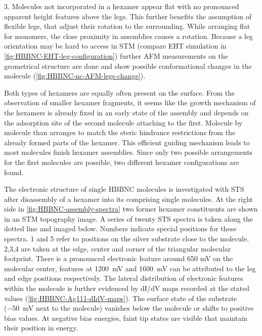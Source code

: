 3. Molecules not incorporated in a hexamer appear flat with no pronounced apparent height features above the legs. This further benefits the assumption of flexible legs, that adjust their rotation to the surrounding. While arranging flat for monomers, the close proximity in assemblies causes a rotation. Because a leg orientation may be hard to access in STM (compare EHT simulation in \autoref{fig:HBBNC-EHT-leg-configuration}) further AFM measurements on the geometrical structure are done and show possible conformational changes in the molecule (\autoref{fig:HBBNC-nc-AFM-legs-change}).

Both types of hexamers are equally often present on the surface. From the observation of smaller hexamer fragments, it seems like the growth mechanism of the hexamers is already fixed in an early state of the assembly and depends on the adsorption site of the second molecule attaching to the first. Molecule by molecule than arranges to match the steric hindrance restrictions from the already formed parts of the hexamer. This efficient guiding mechanism leads to most molecules finish hexamer assemblies. Since only two possible arrangements for the first molecules are possible, two different hexamer configurations are found.

The electronic structure of single HBBNC molecules is investigated with STS after disassembly of a hexamer into its comprising single molecules. At the right side in \autoref{fig:HBBNC-assembly-spectra} two former hexamer constituents are shown in an STM topography image. A series of twenty STS spectra is taken along the dotted line and imaged below. Numbers indicate special positions for these spectra. 1 and 5 refer to positions on the silver substrate close to the molecule. 2,3,4 are taken at the edge, center and corner of the triangular molecular footprint. There is a pronounced electronic feature around 650 mV on the molecular center, features at \SI{1200}{\milli \volt} and \SI{1600}{\milli \volt} can be attributed to the leg and edge positions respectively. The lateral distribution of electronic features within the molecule is further evidenced by dI/dV maps recorded at the stated values (\autoref{fig:HBBNC-Ag111-dIdV-maps}).
The surface state of the substrate (\SI{-50}{\milli \volt} next to the molecule) vanishes below the molecule or shifts to positive bias values. At negative bias energies, faint tip states are visible that maintain their position in energy. 

